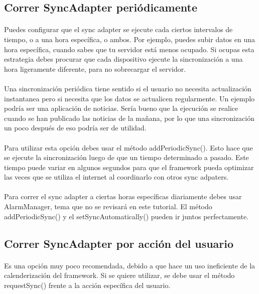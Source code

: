 \documentclass[10pt]{extarticle}
\begin{document}
\subsection{Correr SyncAdapter periódicamente}

\paragraph{}
Puedes configurar que el sync adapter se ejecute cada ciertos intervalos de tiempo, o a una hora específica, o ambos. Por ejemplo, puedes subir datos en una hora específica, cuando sabes que tu servidor está menos ocupado. Si ocupas esta estrategia debes procurar que cada dispositivo ejecute la sincronización a una hora ligeramente diferente, para no sobrecargar el servidor.
\paragraph{}
Una sincronización periódica tiene sentido si el usuario no necesita actualización instantanea pero si necesita que los datos se actualicen regularmente. Un ejemplo podría ser una aplicación de noticias. Sería bueno que la ejecución se realice cuando se han publicado las noticias de la mañana, por lo que una sincronización un poco después de eso podría ser de utilidad.
\paragraph{}
Para utilizar esta opción debes usar el método addPeriodicSync(). Esto hace que se ejecute la sincronización luego de que un tiempo determinado a pasado. Este tiempo puede variar en algunos segundos para que el framework pueda optimizar las veces que se utiliza el internet al coordinarlo con otros sync adpaters.
\paragraph{}
Para correr el sync adapter a ciertas horas específicas diariamente debes usar AlarmManager, tema que no se revisará en este tutorial. El método addPeriodicSync() y el setSyncAutomatically() pueden ir juntos perfectamente.

\subsection{Correr SyncAdapter por acción del usuario}

\paragraph{}
Es una opción muy poco recomendada, debido a que hace un uso ineficiente de la calenderización del framework. Si se quiere utilizar, se debe usar el método requestSync() frente a la acción específica del usuario.
\end{document}
